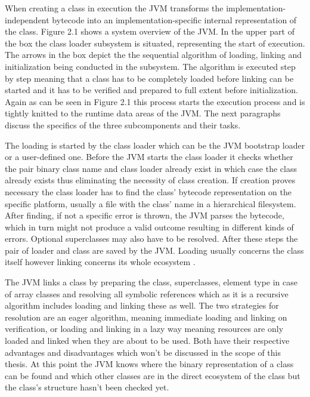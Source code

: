 When creating a class in execution the JVM transforms the implementation-independent bytecode into an implementation-specific internal representation of the class. Figure 2.1 shows a system overview of the JVM. In the upper part of the box the class loader subsystem is situated, representing the start of execution. The arrows in the box depict the the sequential algorithm of loading, linking and initialization being conducted in the subsystem.
The algorithm is executed step by step meaning that a class has to be completely loaded before linking can be started and it has to be verified and prepared to full extent before initialization. Again as can be seen in Figure 2.1 this process starts the execution process and is tightly knitted to the runtime data areas of the JVM.
The next paragraphs discuss the specifics of the three subcomponents and their tasks.

The loading is started by the class loader which can be the JVM bootstrap loader or a user-defined one. Before the JVM starts the class loader it checks whether the pair binary class name and class loader already exist in which case the class already exists thus eliminating the necessity of class creation. If creation proves necessary the class loader has to find the class' bytecode representation on the specific platform, usually a file with the class' name in a hierarchical filesystem. After finding, if not a specific error is thrown, the JVM parses the bytecode, which in turn might not produce a  valid outcome resulting in different kinds of errors. Optional superclasses may also have to be resolved. After these steps the pair of loader and class are saved by the JVM. Loading usually concerns the class itself however linking concerns its whole ecosystem \cite{Lindholm}.

The JVM links a class by preparing the class, superclasses, element type in case of array classes and resolving all symbolic references which as it is a recursive algorithm includes loading and linking these as well. The two strategies for resolution are an eager algorithm, meaning immediate loading and linking on verification, or loading and linking in a lazy way meaning resources are only loaded and linked when they are about to be used. Both have their respective advantages and disadvantages which won't be discussed in the scope of this thesis. At this point the JVM knows where the binary representation of a class can be found and which other classes are in the direct ecosystem of the class but the class's structure hasn't been checked yet\cite{Lindholm}.

